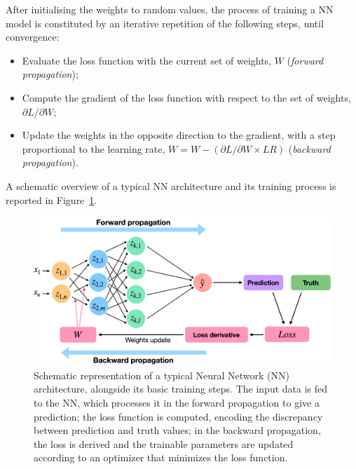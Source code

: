 After initialising the weights to random values, the process of training a NN model is constituted by an iterative repetition of the following steps, until convergence:
\begin{itemize}
    \item Evaluate the loss function with the current set of weights, $W$ (\textit{forward propagation});
    \item Compute the gradient of the loss function with respect to the set of weights, $\partial L/\partial W$;
    \item Update the weights in the opposite direction to the gradient, with a step proportional to the learning rate, $W = W - (\partial L/\partial W \times LR)$ (\textit{backward propagation}).
\end{itemize}
A schematic overview of a typical NN architecture and its training process is reported in Figure~\ref{fig:Architecture}.

\begin{figure}
    \centering
    \includegraphics[width=0.8\linewidth]{Figures/L1TP/Architecture.pdf}
    \caption{Schematic representation of a typical Neural Network (NN) architecture, alongside its basic training steps. The input data is fed to the NN, which processes it in the forward propagation to give a prediction; the loss function is computed, encoding the discrepancy between prediction and truth values; in the backward propagation, the loss is derived and the trainable parameters are updated according to an optimizer that minimizes the loss function.}
    \label{fig:Architecture}
\end{figure}


